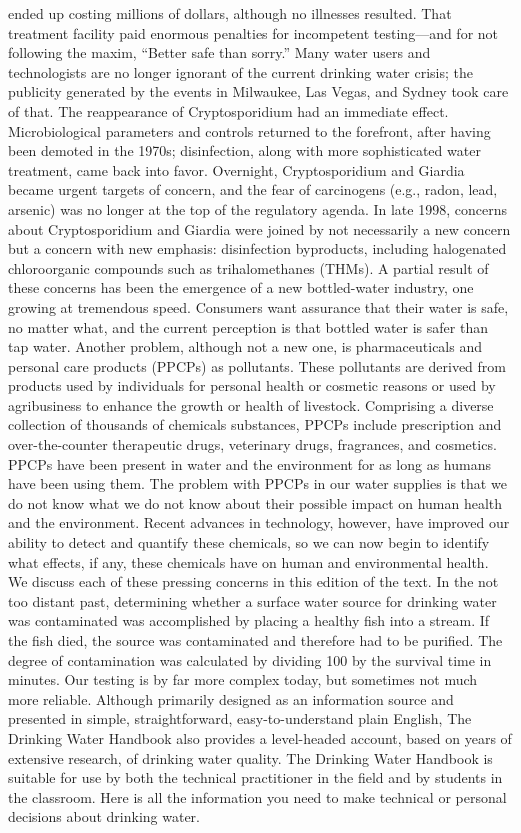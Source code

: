 \documentclass{article}
\begin{document}
ended up costing millions of dollars, although no illnesses resulted.
That treatment facility paid enormous penalties for incompetent
testing---and for not following the maxim, ``Better safe than sorry.''
Many water users and technologists are no longer ignorant of the current
drinking water crisis; the publicity generated by the events in
Milwaukee, Las Vegas, and Sydney took care of that. The reappearance of
Cryptosporidium had an immediate effect. Microbiological parameters and
controls returned to the forefront, after having been demoted in the
1970s; disinfection, along with more sophisticated water treatment, came
back into favor. Overnight, Cryptosporidium and Giardia became urgent
targets of concern, and the fear of carcinogens (e.g., radon, lead,
arsenic) was no longer at the top of the regulatory agenda. In late
1998, concerns about Cryptosporidium and Giardia were joined by not
necessarily a new concern but a concern with new emphasis: disinfection
byproducts, including halogenated chloroorganic compounds such as
trihalomethanes (THMs). A partial result of these concerns has been the
emergence of a new bottled-water industry, one growing at tremendous
speed. Consumers want assurance that their water is safe, no matter
what, and the current perception is that bottled water is safer than tap
water. Another problem, although not a new one, is pharmaceuticals and
personal care products (PPCPs) as pollutants. These pollutants are
derived from products used by individuals for personal health or
cosmetic reasons or used by agribusiness to enhance the growth or health
of livestock. Comprising a diverse collection of thousands of chemicals
substances, PPCPs include prescription and over-the-counter therapeutic
drugs, veterinary drugs, fragrances, and cosmetics. PPCPs have been
present in water and the environment for as long as humans have been
using them. The problem with PPCPs in our water supplies is that we do
not know what we do not know about their possible impact on human health
and the environment. Recent advances in technology, however, have
improved our ability to detect and quantify these chemicals, so we can
now begin to identify what effects, if any, these chemicals have on
human and environmental health. We discuss each of these pressing
concerns in this edition of the text. In the not too distant past,
determining whether a surface water source for drinking water was
contaminated was accomplished by placing a healthy fish into a stream.
If the fish died, the source was contaminated and therefore had to be
purified. The degree of contamination was calculated by dividing 100 by
the survival time in minutes. Our testing is by far more complex today,
but sometimes not much more reliable. Although primarily designed as an
information source and presented in simple, straightforward,
easy-to-understand plain English, The Drinking Water Handbook also
provides a level-headed account, based on years of extensive research,
of drinking water quality. The Drinking Water Handbook is suitable for
use by both the technical practitioner in the field and by students in
the classroom. Here is all the information you need to make technical or
personal decisions about drinking water.
\end{document}
